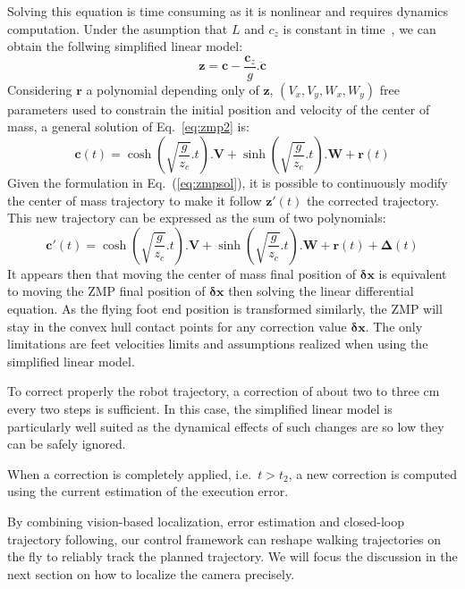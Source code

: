 Solving this equation is time consuming as it is nonlinear and
requires dynamics computation. Under the asumption that $L$ and $c_z$
is constant in time~\cite{Kajita01iros}, we can obtain the follwing simplified
linear model:
%
\begin{equation} \label{eq:zmp2}
  \mathbf{z} = \mathbf{c} - \frac{\mathbf{c}_z}{g} . \ddot{\mathbf{c}}
\end{equation}
%
Considering $\mathbf{r}$ a polynomial depending only of $\mathbf{z}$, $(V_x, V_y, W_x, W_y)$ free parameters used to constrain the initial position and velocity of the center of mass, a general solution of
Eq.~\ref{eq:zmp2} is:
%
\begin{equation} \label{eq:zmpsol}
  \mathbf{c}(t) = \cosh(\sqrt{\frac{g}{z_c}}.t) . \mathbf{V} + \sinh(\sqrt{\frac{g}{z_c}}.t) . \mathbf{W} + \mathbf{r}(t)
\end{equation}
%
Given the formulation in Eq.~(\ref{eq:zmpsol}), it is possible to continuously modify the center of mass trajectory to make it follow \mbox{$\mathbf{z}'(t)$} the corrected trajectory. This new trajectory can be expressed as the sum of two polynomials:
%
\begin{equation} \label{eq:zmpsolcor}
  \mathbf{c}'(t) = \cosh(\sqrt{\frac{g}{z_c}}.t) . \mathbf{V} +
  \sinh(\sqrt{\frac{g}{z_c}}.t) . \mathbf{W} + \mathbf{r}(t) + \mathbf{\Delta}(t)
\end{equation}
%
It appears then that moving the center of mass final position of $\mathbf{\delta x}$ is equivalent to moving the ZMP final position of $\mathbf{\delta x}$ then solving the linear differential equation. As
the flying foot end position is transformed similarly, the ZMP will stay in the convex hull contact points for any correction value $\mathbf{\delta x}$. The only limitations are feet velocities limits
and assumptions realized when using the simplified linear model.

To correct properly the robot trajectory, a correction of about two to
three cm every two steps is sufficient. In this case, the simplified
linear model is particularly well suited as the dynamical effects of
such changes are so low they can be safely ignored.

When a correction is completely applied, i.e.\ $t > t_2$, a new correction is computed using the current estimation of the execution error.

By combining vision-based localization, error estimation and closed-loop trajectory following, our control framework can reshape walking trajectories on the fly to reliably track the planned trajectory. We will focus the discussion in the next section on how to localize the camera precisely.

